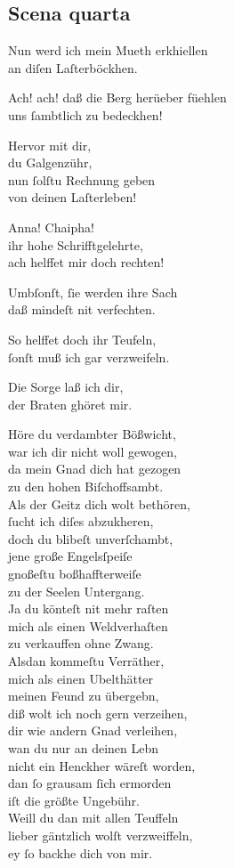 \documentclass{ees}
\newenvironment{lyrics}[1]{%
  \subsection{#1}\nopagebreak%
  \begin{lyricslist}%
  \let\voice\item%
}{%
  \end{lyricslist}%
}
\begin{document}
\begin{lyrics}{Scena quarta}
  \voice[Judex]
  Nun werd ich mein Mueth erkhiellen\\
  an diſen Laſterböckhen.

  \voice[Chorus]
  Ach! ach! daß die Berg herüeber füehlen\\
  uns ſambtlich zu bedeckhen!

  \voice[St: Michael]
  Hervor mit dir,\\
  du Galgenzühr,\\
  nun ſolſtu Rechnung geben\\
  von deinen Laſterleben!

  \voice[Judas]
  Anna! Chaipha!\\
  ihr hohe Schrifftgelehrte,\\
  ach helffet mir doch rechten!

  \voice[St: Michael]
  Umbſonſt, ſie werden ihre Sach\\
  daß mindeſt nit verfechten.

  \voice[Judas]
  So helffet doch ihr Teufeln,\\
  ſonſt muß ich gar verzweifeln.

  \voice[Lucifer]
  Die Sorge laß ich dir,\\
  der Braten ghöret mir.

  \voice[Judex]
  Höre du verdambter Bößwicht,\\
  war ich dir nicht woll gewogen,\\
  da mein Gnad dich hat gezogen\\
  zu den hohen Biſchoffsambt.\\
  Als der Geitz dich wolt bethören,\\
  ſucht ich diſes abzukheren,\\
  doch du blibeſt unverſchambt,\\
  jene große Engelsſpeiſe\\
  gnoßeſtu boßhaffterweiſe\\
  zu der Seelen Untergang.\\
  Ja du könteſt nit mehr raſten\\
  mich als einen Weldverhaſten\\
  zu verkauffen ohne Zwang.\\
  Alsdan kommeſtu Verräther,\\
  mich als einen Ubelthätter\\
  meinen Feund zu übergebn,\\
  diß wolt ich noch gern verzeihen,\\
  dir wie andern Gnad verleihen,\\
  wan du nur an deinen Lebn\\
  nicht ein Henckher wäreſt worden,\\
  dan ſo grausam ſich ermorden\\
  iſt die größte Ungebühr.\\
  Weill du dan mit allen Teuffeln\\
  lieber gäntzlich wolſt verzweiffeln,\\
  ey ſo backhe dich von mir.


\end{lyrics}
\end{document}

